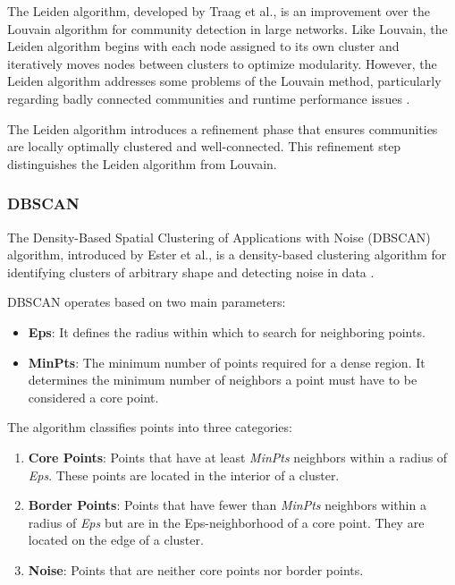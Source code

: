 \documentclass{ieeeaccess}
\begin{document}
The Leiden algorithm, developed by Traag et al., is an improvement over the Louvain algorithm for community detection in large networks. Like Louvain, the Leiden algorithm begins with each node assigned to its own cluster and iteratively moves nodes between clusters to optimize modularity. However, the Leiden algorithm addresses some problems of the Louvain method, particularly regarding badly connected communities and runtime performance issues \cite{leiden}.

The Leiden algorithm introduces a refinement phase that ensures communities are locally optimally clustered and well-connected. This refinement step distinguishes the Leiden algorithm from Louvain.


\subsubsection{DBSCAN}
\label{subsubsec:dbscan}

The Density-Based Spatial Clustering of Applications with Noise (DBSCAN) algorithm, introduced by Ester et al., is a density-based clustering algorithm for identifying clusters of arbitrary shape and detecting noise in data \cite{dbscan}.

DBSCAN operates based on two main parameters:

\begin{itemize}
    \item \textbf{Eps}: It defines the radius within which to search for neighboring points.
    \item \textbf{MinPts}: The minimum number of points required for a dense region. It determines the minimum number of neighbors a point must have to be considered a core point.
\end{itemize}

The algorithm classifies points into three categories:

\begin{enumerate}
    \item \textbf{Core Points}: Points that have at least \textit{MinPts} neighbors within a radius of \textit{Eps}. These points are located in the interior of a cluster.
    \item \textbf{Border Points}: Points that have fewer than \textit{MinPts} neighbors within a radius of \textit{Eps} but are in the Eps-neighborhood of a core point. They are located on the edge of a cluster.
    \item \textbf{Noise}: Points that are neither core points nor border points.
\end{enumerate}
\end{document}
